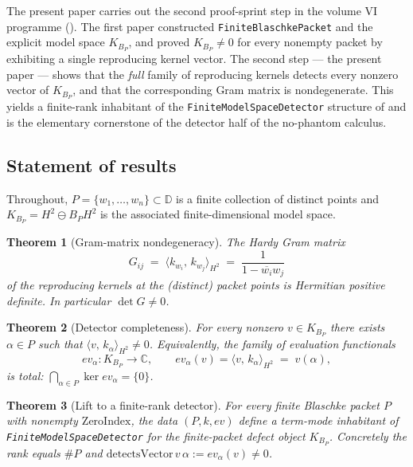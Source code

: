 \documentclass[12pt]{article}
\newtheorem{theorem}{Theorem}[section]
\theoremstyle{definition}
\theoremstyle{remark}
\newcommand{\C}{\mathbb{C}}
\newcommand{\D}{\mathbb{D}}
\newcommand{\HHH}{H^{2}}
\newcommand{\KBP}{K_{B_{P}}}
\newcommand{\inner}[2]{\langle #1,\,#2\rangle}
\newcommand{\conj}[1]{\overline{#1}}
\begin{document}
The present paper carries out the second proof-sprint step in the volume
VI programme (\cite{Vol6KB}). The first paper constructed
\texttt{FiniteBlaschkePacket} and the explicit model space
$\KBP$, and proved
$\KBP\neq0$ for every nonempty packet by exhibiting a single reproducing
kernel vector. The second step --- the present paper --- shows that the
\emph{full} family of reproducing kernels detects every nonzero vector
of $\KBP$, and that the corresponding Gram matrix is nondegenerate. This
yields a finite-rank inhabitant of the \texttt{FiniteModelSpaceDetector}
structure of \cite[\S2.7]{Vol5KB} and is the elementary cornerstone of the
detector half of the no-phantom calculus.

\subsection{Statement of results}

Throughout, $P=\{w_{1},\dots,w_{n}\}\subset\D$ is a finite collection of
distinct points and $\KBP=\HHH\ominus B_{P}\HHH$ is the associated
finite-dimensional model space.

\begin{theorem}[Gram-matrix nondegeneracy]\label{thm:gram-intro}
The Hardy Gram matrix
\[
  G_{ij}\;=\;\inner{k_{w_{i}}}{k_{w_{j}}}_{\HHH}\;=\;\frac{1}{1-\conj{w_{i}}w_{j}}
\]
of the reproducing kernels at the (distinct) packet points is Hermitian
positive definite. In particular $\det G\neq0$.
\end{theorem}

\begin{theorem}[Detector completeness]\label{thm:detector-complete-intro}
For every nonzero $v\in\KBP$ there exists $\alpha\in P$ such that
$\inner{v}{k_{\alpha}}_{\HHH}\neq0$. Equivalently, the family of
evaluation functionals
\[
  ev_{\alpha}:\KBP\to\C,\qquad ev_{\alpha}(v)=\inner{v}{k_{\alpha}}_{\HHH}\;=\;v(\alpha),
\]
is total: $\bigcap_{\alpha\in P}\ker ev_{\alpha}=\{0\}$.
\end{theorem}

\begin{theorem}[Lift to a finite-rank detector]\label{thm:lift-intro}
For every finite Blaschke packet $P$ with nonempty $\mathrm{ZeroIndex}$,
the data $(P,k,ev)$ define a term-mode inhabitant of
\texttt{FiniteModelSpaceDetector} for the finite-packet defect object
$\KBP$. Concretely the rank equals $\#P$ and
$\mathrm{detectsVector}\,v\,\alpha:=ev_{\alpha}(v)\neq0$.
\end{theorem}
\end{document}
